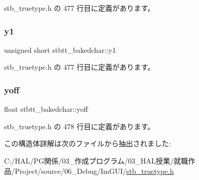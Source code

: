  stb\+\_\+truetype.\+h の 477 行目に定義があります。

\mbox{\label{structstbtt__bakedchar_ac831dc667f6c39b5d22740c6cbd5bc3f}} 
\subsubsection{\texorpdfstring{y1}{y1}}
{\footnotesize\ttfamily unsigned short stbtt\+\_\+bakedchar\+::y1}



 stb\+\_\+truetype.\+h の 477 行目に定義があります。

\mbox{\label{structstbtt__bakedchar_aba01393e52d1c6f4ce86a8b51e498bb4}} 
\subsubsection{\texorpdfstring{yoff}{yoff}}
{\footnotesize\ttfamily float stbtt\+\_\+bakedchar\+::yoff}



 stb\+\_\+truetype.\+h の 478 行目に定義があります。



この構造体詳解は次のファイルから抽出されました\+:\begin{DoxyCompactItemize}
\item 
C\+:/\+H\+A\+L/\+P\+G関係/03\+\_\+作成プログラム/03\+\_\+\+H\+A\+L授業/就職作品/\+Project/source/06\+\_\+\+Debug/\+Im\+G\+U\+I/\mbox{\hyperlink{stb__truetype_8h}{stb\+\_\+truetype.\+h}}\end{DoxyCompactItemize}

